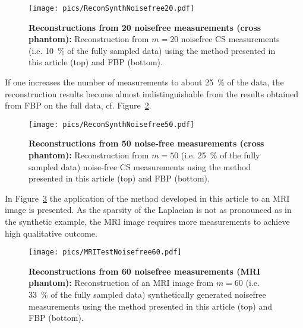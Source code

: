 \documentclass[11pt]{article}
\begin{document}
\begin{psfrags}
	\begin{figure}[htb!]
		\begin{center}
			\texttt{[image: pics/ReconSynthNoisefree20.pdf]}
			\caption{\textbf{Reconstructions from 20 noisefree  measurements (cross phantom):} \label{fig:reconNoisefree20} Reconstruction from $m = 20$
				noisefree CS  measurements (i.e. \SI{10}{\percent} of the fully sampled  data)  using the method
				presented in this article (top) and  FBP (bottom).}
		\end{center}
	\end{figure}
\end{psfrags}

If one increases the number of measurements to about \SI{25}{\percent}  of the data, the reconstruction results become almost indistinguishable from the results obtained from FBP on the full data, cf. Figure~\ref{fig:reconNoisefree50}.

\begin{psfrags}
	\begin{figure}[htb!]
		\begin{center}
			\texttt{[image: pics/ReconSynthNoisefree50.pdf]}
			\caption{\textbf{Reconstructions from 50 noise-free measurements (cross phantom):}\label{fig:reconNoisefree50} Reconstruction from $m=50$ (i.e. \SI{25}{\percent} of the fully sampled  data) noise-free  CS  measurements using the method presented in this article (top) and  FBP (bottom).}
		\end{center}
	\end{figure}
\end{psfrags}


In Figure~\ref{fig:reconMRI60} the application of the method developed in this article to an MRI
image is presented. As the sparsity of the Laplacian is not as pronounced as in the synthetic example, the MRI image requires more measurements to achieve high qualitative outcome.

\begin{psfrags}
	\begin{figure}[htb!]
		\begin{center}
			\texttt{[image: pics/MRITestNoisefree60.pdf]}
			\caption{\textbf{Reconstructions from 60 noisefree measurements (MRI phantom):}\label{fig:reconMRI60} Reconstruction of an MRI image from $m=60$ (i.e. \SI{33}{\percent} of the fully sampled  data) synthetically generated noisefree measurements using the method presented in this article (top) and  FBP (bottom).}
		\end{center}
	\end{figure}
\end{psfrags}
\end{document}
